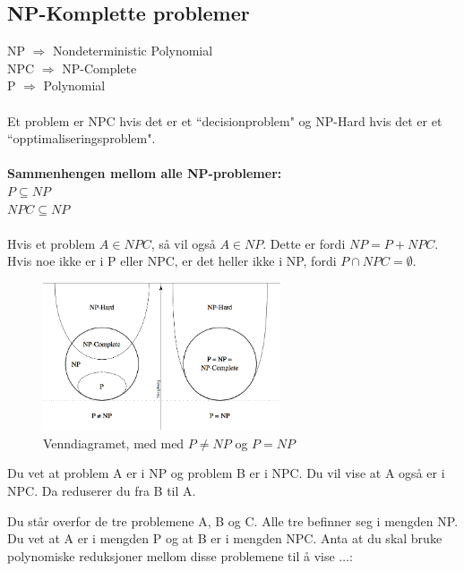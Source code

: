 \documentclass[a4paper, norsk,  10pt]{article}
\begin{document}
{{\begin{algorithmic}
\section{NP-Komplette problemer}

\noindent NP $\Rightarrow$ Nondeterministic Polynomial \\
\noindent NPC $\Rightarrow$ NP-Complete\\
\noindent P $\Rightarrow$ Polynomial \\ \\

\noindent Et problem er NPC hvis det er et ``decisionproblem" og NP-Hard hvis det er  et ``opptimaliseringsproblem". \\ \\

\noindent \textbf{Sammenhengen mellom alle NP-problemer:} \\

$P \subseteq NP$ \\
$NPC \subseteq NP$ \\ \\

\noindent Hvis et problem $A \in NPC$, så vil også $A \in NP$. Dette er fordi $NP = P + NPC$. Hvis noe ikke er i P eller NPC, er det heller ikke i NP, fordi $P \cap NPC = \emptyset$. \\ \hfill
\begin{figure}[hbt]
    \begin{center}
        \includegraphics[width=7cm] {npc.png}
        \caption{Venndiagramet, med med $P \neq NP$ og $P = NP$}
    \end{center}
\end{figure}

\noindent Du vet at problem A er i NP og problem B er i NPC. Du vil vise at A også er i NPC. Da reduserer du fra B til A.\\ \hfill

\noindent Du står overfor de tre problemene A, B og C. Alle tre befinner seg i mengden NP. Du vet at A er i mengden P og at B er i mengden NPC. Anta at du skal bruke polynomiske reduksjoner mellom disse problemene til å vise $\dots$:


\end{algorithmic}}}
\end{document}
